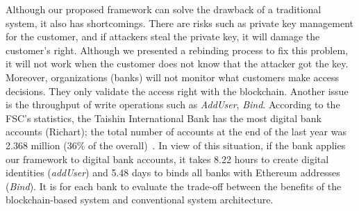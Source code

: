 Although our proposed framework can solve the drawback of a traditional system, it also has shortcomings. There are risks such as private key management for the customer, and if attackers steal the private key, it will damage the customer's right. Although we presented a rebinding process to fix this problem, it will not work when the customer does not know that the attacker got the key. Moreover, organizations (banks) will not monitor what customers make access decisions. They only validate the access right with the blockchain. Another issue is the throughput of write operations such as \textit{AddUser}, \textit{Bind}. According to the FSC's statistics, the Taishin International Bank has the most digital bank accounts (Richart); the total number of accounts at the end of the last year was 2.368 million (36\% of the overall)~\cite{cna_2021}. In view of this situation, if the bank applies our framework to digital bank accounts, it takes 8.22 hours to create digital identities (\textit{addUser}) and 5.48 days to binds all banks with Ethereum addresses (\textit{Bind}). It is for each bank to evaluate the trade-off between the benefits of the blockchain-based system and conventional system architecture.